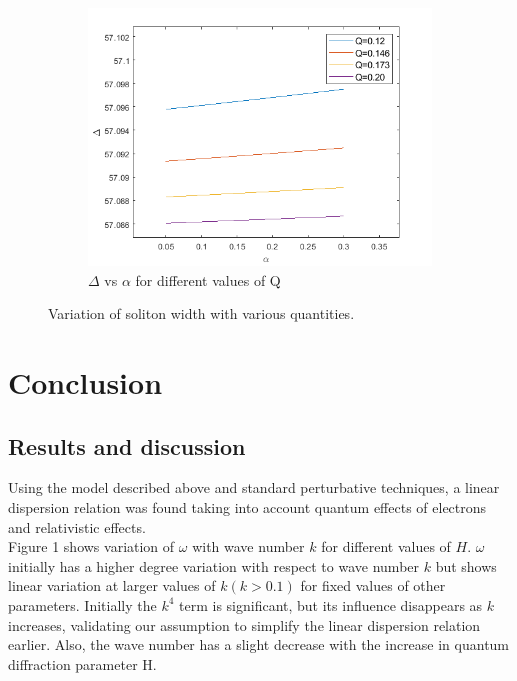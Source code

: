 \documentclass[journal]{IEEEtran}
\begin{document}
\begin{figure}
		\begin{subfigure}[b]{1\linewidth}
			\includegraphics[width=\linewidth]{"delta vs alpha"}
			\caption{$\Delta$ vs $\alpha$ for different values of Q}
		\end{subfigure}


		\caption{Variation of soliton width with various quantities.}
		\label{fig:fig7}
	\end{figure}


\section{Conclusion}

\subsection{Results and discussion}
Using the model described above and standard perturbative techniques, a linear dispersion relation was found taking into account quantum effects of electrons and relativistic effects.\\
		
		Figure 1 shows variation of $\omega$ with wave number $k$ for different values of $H$. $\omega$ initially has a higher degree variation with respect to wave number $k$ but shows linear variation at larger values of $k (k>0.1)$ for fixed values of other parameters. Initially the $k^4$ term is significant, but its influence disappears as $k$ increases, validating our assumption to simplify the linear dispersion relation earlier. Also, the wave number has  a slight decrease with the increase in quantum diffraction parameter H.\\
		
\end{document}

